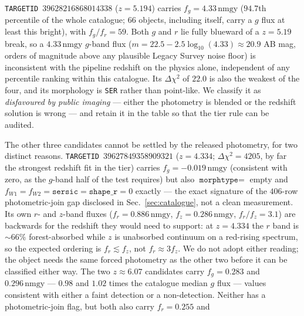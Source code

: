 \documentclass[aps,prd,twocolumn,superscriptaddress,nofootinbib,longbibliography,floatfix]{revtex4-2}
\newcommand{\TARGETID}{\texttt{TARGETID}}
\newcommand{\nmgy}{\,\mathrm{nmgy}}
\begin{document}
\begin{description}[leftmargin=0em,itemsep=3pt]
  \item[Refuted] \TARGETID~$39628216868014338$ ($z = 5.194$) carries
    $f_g = 4.33\nmgy$ ($94.7$th percentile of the whole catalogue; $66$
    objects, including itself, carry a $g$ flux at least this bright), with
    $f_g/f_r = 59$.
    Both $g$ and $r$ lie fully blueward of a $z = 5.19$ break, so a
    $4.33\nmgy$ $g$-band flux ($m = 22.5 - 2.5\log_{10}(4.33) \approx 20.9$
    AB mag, orders of magnitude
    above any plausible Legacy Survey noise floor) is inconsistent with the
    pipeline redshift on the physics alone, independent of any percentile
    ranking within this catalogue. Its $\Delta\chi^2$ of $22.0$ is also the
    weakest of the four, and its morphology is \texttt{SER} rather than
    point-like. We classify it as \emph{disfavoured by public imaging} ---
    either the photometry is blended or the redshift solution is wrong ---
    and retain it in the table so that the tier rule can be audited.
  \item[Undecidable from the release] The other three candidates cannot be
    settled by the released photometry, for two distinct reasons.
    \TARGETID~$39627849358909321$
    ($z=4.334$; $\Delta\chi^2=4205$, by far the strongest redshift fit in the
    tier) carries $f_g=-0.019\nmgy$ (consistent with zero, as the $g$-band
    half of the test requires) but also $\texttt{morphtype}=$ empty and
    $f_{W1}=f_{W2}=\texttt{sersic}=\texttt{shape\_r}=0$ exactly --- the exact
    signature of the $406$-row photometric-join gap disclosed in
    Sec.~\ref{sec:catalogue}, not a clean measurement. Its own $r$- and
    $z$-band fluxes ($f_r=0.886\nmgy$, $f_z=0.286\nmgy$, $f_r/f_z=3.1$) are
    backwards for the redshift they would need to support: at $z=4.334$ the
    $r$ band is $\sim\!66\%$ forest-absorbed while $z$ is unabsorbed
    continuum on a red-rising spectrum, so the expected ordering is
    $f_r\lesssim f_z$, not $f_r\approx 3f_z$. We do not adopt either reading;
    the object needs the same forced photometry as the other two before it
    can be classified either way.
    The two $z \approx 6.07$ candidates carry $f_g = 0.283$ and
    $0.296\nmgy$ --- $0.98$ and $1.02$ times the catalogue median $g$ flux ---
    values consistent with either a faint detection or a non-detection.
    Neither has a photometric-join flag, but both also carry $f_r=0.255$ and

\end{description}
\end{document}
